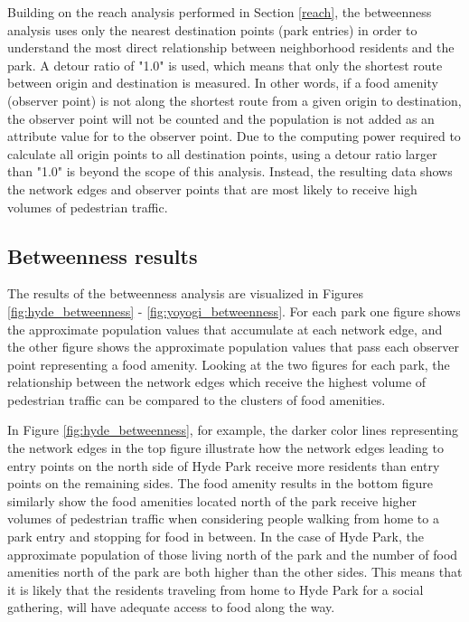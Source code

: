\begin{multicols}{2}

Building on the reach analysis performed in Section \ref{reach}, the betweenness analysis uses only the nearest destination points (park entries) in order to understand the most direct relationship between neighborhood residents and the park. A detour ratio of "1.0" is used, which means that only the shortest route between origin and destination is measured. In other words, if a food amenity (observer point) is not along the shortest route from a given origin to destination, the observer point will not be counted and the population is not added as an attribute value for to the observer point. Due to the computing power required to calculate all origin points to all destination points, using a detour ratio larger than "1.0" is beyond the scope of this analysis. Instead, the resulting data shows the network edges and observer points that are most likely to receive high volumes of pedestrian traffic.

\subsection{Betweenness results}
The results of the betweenness analysis are visualized in Figures \ref{fig:hyde_betweenness} - \ref{fig:yoyogi_betweenness}. For each park one figure shows the approximate population values that accumulate at each network edge, and the other figure shows the approximate population values that pass each observer point representing a food amenity. Looking at the two figures for each park, the relationship between the network edges which receive the highest volume of pedestrian traffic can be compared to the clusters of food amenities.

In Figure \ref{fig:hyde_betweenness}, for example, the darker color lines representing the network edges in the top figure illustrate how the network edges leading to entry points on the north side of Hyde Park receive more residents than entry points on the remaining sides. The food amenity results in the bottom figure similarly show the food amenities located north of the park receive higher volumes of pedestrian traffic when considering people walking from home to a park entry and stopping for food in between. In the case of Hyde Park, the approximate population of those living north of the park and the number of food amenities north of the park are both higher than the other sides. This means that it is likely that the residents traveling from home to Hyde Park for a social gathering, will have adequate access to food along the way. 


\end{multicols}
